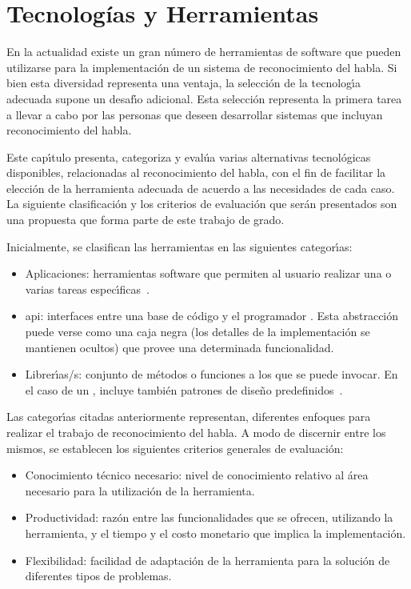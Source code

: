  \chapter{Tecnolog\'ias y Herramientas}
\label{sec:tecnologias}

En la actualidad existe un gran n\'umero de herramientas de software que pueden utilizarse para 
la implementaci\'on de un sistema de reconocimiento del habla. Si bien esta diversidad representa 
una ventaja, la selecci\'on de la tecnolog{\'\i}a adecuada supone un desaf{\'\i}o adicional. 
Esta selecci\'on representa la primera tarea a llevar a
cabo por las personas que deseen desarrollar sistemas que incluyan reconocimiento del habla.

Este cap{\'\i}tulo presenta, categoriza y eval\'ua varias alternativas tecnol\'ogicas disponibles, relacionadas al reconocimiento del habla, con el fin de facilitar la elecci\'on de la herramienta
adecuada de acuerdo a las necesidades de cada caso. La siguiente clasificaci\'on y los criterios
de evaluaci\'on que ser\'an presentados son una propuesta que forma parte de este trabajo de grado.

Inicialmente, se clasifican las herramientas en las siguientes categor{\'\i}as:
\begin{itemize}
    \item Aplicaciones: herramientas software que permiten al usuario realizar una o
    varias tareas \mbox{espec{\'\i}ficas \cite{GoodwillComputer}}.
    \item \gls{api}: interfaces entre una base de c\'odigo y
    el programador \cite{DoucetteOnApi}. Esta abstracci\'on puede verse como una caja negra
    (los detalles de la implementaci\'on se mantienen ocultos) que provee una determinada funcionalidad.
    \item Librer{\'\i}as/s: conjunto de m\'etodos o funciones a los que se puede invocar.
    En el caso de un , incluye tambi\'en patrones de dise\~no
    \mbox{predefinidos \cite{FowlerInversion}}.
\end{itemize}

Las categor{\'\i}as citadas anteriormente representan, diferentes enfoques para realizar el trabajo
de reconocimiento del habla. A modo de discernir entre los mismos, se establecen
los siguientes criterios generales de evaluaci\'on:
\begin{itemize}
    \item Conocimiento t\'ecnico necesario: nivel de conocimiento relativo al \'area necesario para la
    utilizaci\'on de la herramienta. 
    \item Productividad:  raz\'on entre las funcionalidades que se ofrecen, utilizando la herramienta, 
    y el tiempo y el costo monetario que implica la implementaci\'on.
    \item Flexibilidad: facilidad de adaptaci\'on de la herramienta para la soluci\'on de diferentes
    tipos de problemas.
\end{itemize}

